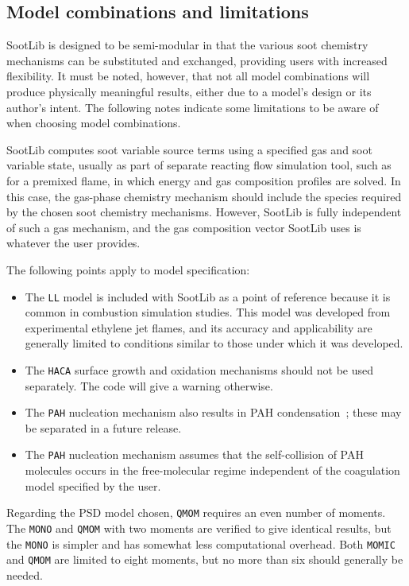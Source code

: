 \documentclass[preprint,letterpaper]{elsarticle}
\begin{document}

\subsection{Model combinations and limitations}
\label{s:limitations}

SootLib is designed to be semi-modular in that the various soot chemistry mechanisms can be substituted and exchanged, providing users with increased flexibility. It must be noted, however, that not all model combinations will produce physically meaningful results, either due to a model's design or its author's intent. The following notes indicate some limitations to be aware of when choosing model combinations.

SootLib computes soot variable source terms using a specified gas and soot variable state, usually as part of separate reacting flow simulation tool, such as for a premixed flame, in which energy and gas composition profiles are solved. In this case, the gas-phase chemistry mechanism should include the species required by the chosen soot chemistry mechanisms. However, SootLib is fully independent of such a gas mechanism, and the gas composition vector SootLib uses is whatever the user provides.  

The following points apply to model specification:
\begin{itemize}
\item The \texttt{LL} model is included with SootLib as a point of reference because it is common in combustion simulation studies. This model was developed from experimental ethylene jet flames, and its accuracy and applicability are generally limited to conditions similar to those under which it was developed.
\item The \texttt{HACA} surface growth and oxidation mechanisms should not be used separately. The code will give a warning otherwise.
\item The \texttt{PAH} nucleation mechanism also results in PAH condensation~\cite{Blanquart_2009c}; these may be separated in a future release.
\item The \texttt{PAH} nucleation mechanism assumes that the self-collision of PAH molecules occurs in the free-molecular regime independent of the coagulation model specified by the user.
\end{itemize}
%

Regarding the PSD model chosen, \texttt{QMOM} requires an even number of moments. The \texttt{MONO} and \texttt{QMOM} with two moments are verified to give identical results, but the \texttt{MONO} is simpler and has somewhat less computational overhead. Both \texttt{MOMIC} and \texttt{QMOM} are limited to eight moments, but no more than six should generally be needed.
\end{document}
